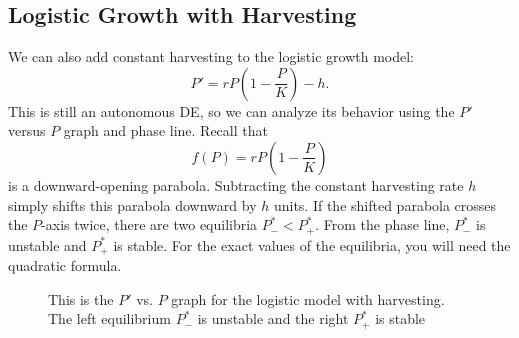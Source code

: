 \documentclass[10pt,letterpaper]{article}
\begin{document}

\subsection{Logistic Growth with Harvesting}
We can also add constant harvesting to the logistic growth model:
\[
P'=rP\left(1-\frac{P}{K}\right)-h.
\]
This is still an autonomous DE, so we can analyze its behavior using the
$P'$ versus $P$ graph and phase line. Recall that
\[
f(P)=rP\left(1-\frac{P}{K}\right)
\]
is a downward-opening parabola. Subtracting the constant harvesting rate $h$
simply shifts this parabola downward by $h$ units. If the shifted parabola crosses the $P$-axis twice, there are two equilibria $P^*_-<P^*_+$. From the phase line, $P^*_-$ is unstable and $P^*_+$ is stable. For the exact values of the equilibria, you will need the quadratic formula.

\begin{figure}[H]
    \centering
{}\caption{This is the $P'$ vs. $P$ graph for the logistic model with harvesting. The left equilibrium $P^*_-$ is unstable and the right $P^*_+$ is stable}
\end{figure}
\end{document}
